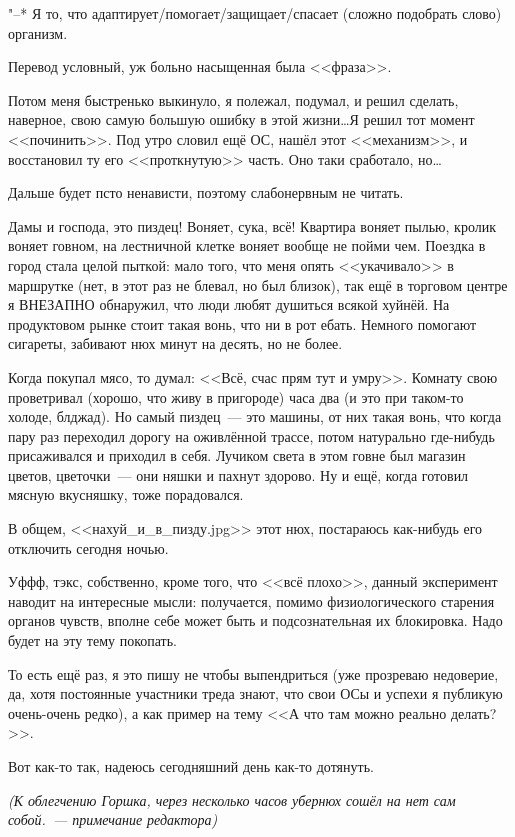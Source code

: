 \documentclass[a4paper,14pt,oneside]{memoir}
\begin{document}
\begin{shaded}
"--* Я то, что адаптирует/помогает/защищает/спасает (сложно подобрать слово) организм.

Перевод условный, уж больно насыщенная была <<фраза>>.

Потом меня быстренько выкинуло, я полежал, подумал, и решил сделать, наверное, свою самую большую ошибку в этой жизни\ldots Я решил тот момент <<починить>>.
Под утро словил ещё ОС, нашёл этот <<механизм>>, и восстановил ту его <<проткнутую>> часть.
Оно таки сработало, но…

Дальше будет псто ненависти, поэтому слабонервным не читать.

Дамы и господа, это пиздец! Воняет, сука, всё! Квартира воняет пылью, кролик воняет говном, на лестничной клетке воняет вообще не пойми чем. Поездка в город стала целой пыткой: мало того, что меня опять <<укачивало>> в маршрутке (нет, в этот раз не блевал, но был близок), так ещё в торговом центре я ВНЕЗАПНО обнаружил, что люди любят душиться всякой хуйнёй. На продуктовом рынке стоит такая вонь, что ни в рот ебать. Немного помогают сигареты, забивают нюх минут на десять, но не более.

Когда покупал мясо, то думал: <<Всё, счас прям тут и умру>>. Комнату свою проветривал (хорошо, что живу в пригороде) часа два (и это при таком-то холоде, блджад).
Но самый пиздец~--- это машины, от них такая вонь, что когда пару раз переходил дорогу на оживлённой трассе, потом натурально где-нибудь присаживался и приходил в себя.
Лучиком света в этом говне был магазин цветов, цветочки~--- они няшки и пахнут здорово. Ну и ещё, когда готовил мясную вкусняшку, тоже порадовался.

В общем, <<нахуй\_и\_в\_пизду.jpg>> этот нюх, постараюсь как-нибудь его отключить сегодня ночью.

Уффф, тэкс, собственно, кроме того, что <<всё плохо>>, данный эксперимент наводит на интересные мысли: получается, помимо физиологического старения органов чувств, вполне себе может быть и подсознательная их блокировка. Надо будет на эту тему покопать.

То есть ещё раз, я это пишу не чтобы выпендриться (уже прозреваю недоверие, да, хотя постоянные участники треда знают, что свои ОСы и успехи я публикую очень-очень редко), а как пример на тему <<А что там можно реально делать?>>.

Вот как-то так, надеюсь сегодняшний день как-то дотянуть.

\smallskip

\textit{(К облегчению Горшка, через несколько часов убернюх сошёл на нет сам собой.~--- примечание редактора)}

\end{shaded}
\end{document}

